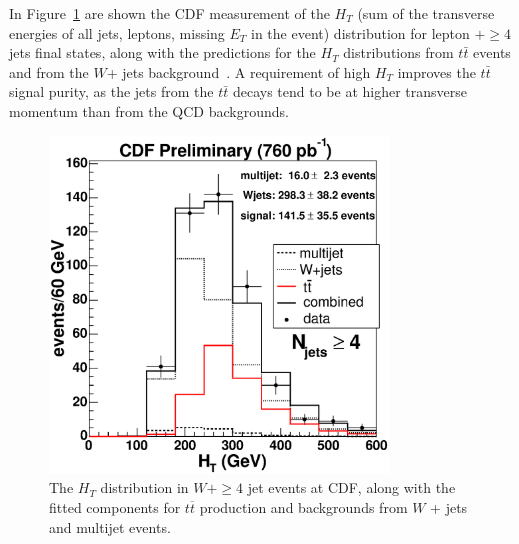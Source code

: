 \documentclass[12pt]{iopart}
\begin{document}
In Figure~\ref{fig:fitHt_4j} are shown the CDF measurement of the $H_T$ (sum of the transverse energies of all jets,
leptons, missing $E_T$ in the event) distribution for lepton $ + \ge 4$ jets final states, along with the
predictions for the $H_T$ distributions from $t\bar{t}$ events and from the $W$+ jets background~\cite{Acosta:2005am, cdftop}. A requirement of
high $H_T$ improves the $t\bar{t}$ signal purity, as the jets from the $t\bar{t}$ decays tend to be at higher
transverse momentum than from the QCD backgrounds. 
%
\begin{figure}
\begin{center}
\includegraphics[width=9cm]{fitHt_4j.eps}
\end{center}
\caption{The $H_T$ distribution in $W+\ge 4$ jet events at CDF, along with the fitted components for $t\overline{t}$ production and backgrounds from $W$ + jets and multijet events. 
\label{fig:fitHt_4j}}
\end{figure}
%
\end{document}
